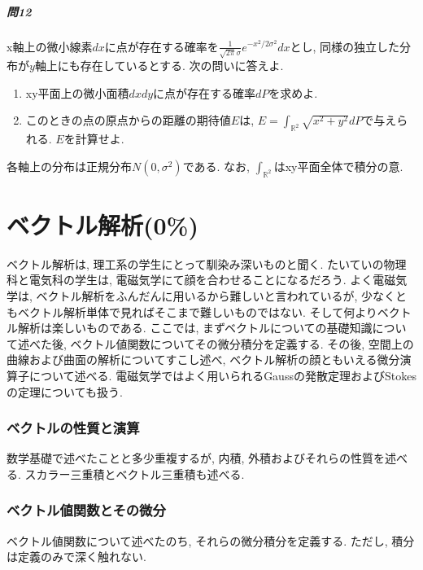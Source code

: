 \documentclass[a4j,dvipdfmx]{jsarticle}
\numberwithin{equation}{section}
\begin{document}
            \subsubsection*{問12} x軸上の微小線素$dx$に点が存在する確率を$\frac{1}{\sqrt{2\pi}\sigma}e^{-x^2/2\sigma^2}dx$とし, 同様の独立した分布が$y$軸上にも存在しているとする. 次の問いに答えよ.
                \begin{enumerate}\renewcommand{\labelenumi}{(\roman{enumi})}
                    \item xy平面上の微小面積$dxdy$に点が存在する確率$dP$を求めよ.
                    \item このときの点の原点からの距離の期待値$E$は, $E=\displaystyle\int_{\mathbb{R}^2}\sqrt{x^2+y^2}dP$で与えられる. $E$を計算せよ.
                \end{enumerate}
                各軸上の分布は正規分布$N(0,\sigma^2)$である. なお, $\int_{\mathbb{R}^2}$はxy平面全体で積分の意.
    \clearpage
    
    \part{ベクトル解析(0\%)}
    \begin{screen}
        ベクトル解析は, 理工系の学生にとって馴染み深いものと聞く. たいていの物理科と電気科の学生は, 電磁気学にて顔を合わせることになるだろう.
        よく電磁気学は, ベクトル解析をふんだんに用いるから難しいと言われているが, 少なくともベクトル解析単体で見ればそこまで難しいものではない. 
        そして何よりベクトル解析は楽しいものである. ここでは, まずベクトルについての基礎知識について述べた後, ベクトル値関数についてその微分積分を定義する.
        その後, 空間上の曲線および曲面の解析についてすこし述べ, ベクトル解析の顔ともいえる微分演算子について述べる.
        電磁気学ではよく用いられるGaussの発散定理およびStokesの定理についても扱う. 
    \end{screen}
    \clearpage
    \section{ベクトルの性質と演算}
        数学基礎で述べたことと多少重複するが, 内積, 外積およびそれらの性質を述べる. スカラー三重積とベクトル三重積も述べる.
    \clearpage
    \section{ベクトル値関数とその微分}
        ベクトル値関数について述べたのち, それらの微分積分を定義する. ただし, 積分は定義のみで深く触れない.
    \clearpage
\end{document}
